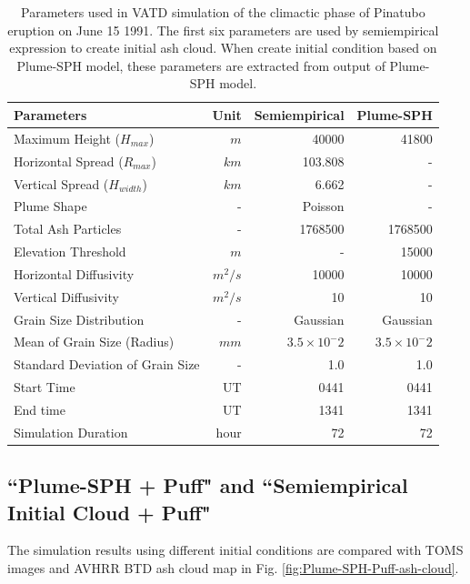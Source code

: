 \documentclass[draft,linenumbers]{agujournal2019}
\begin{document}
\begin{table}[htp]
\centering
      \caption{Parameters used in VATD simulation of the climactic phase of Pinatubo eruption on June 15 1991. The first six parameters are used by semiempirical expression to create initial ash cloud. When create initial condition based on Plume-SPH model, these parameters are extracted from output of Plume-SPH model.}
	  \begin{tabular}{lrrr}
	    \hline
	    Parameters & Unit & Semiempirical & Plume-SPH \\
	    \hline
	    Maximum Height ($H_{max}$) & $m$ & 40000 & 41800 \\
	    Horizontal Spread ($R_{max}$) & $km$ & 103.808 & -\\
	    Vertical Spread ($H_{width}$) & $km$ & 6.662  & - \\
	    Plume Shape & - & Poisson & - \\
	    Total Ash Particles  & - & 1768500 & 1768500 \\
	    Elevation Threshold & $m$ & - &  15000 \\
	    Horizontal Diffusivity & $m^2/s$ &10000 & 10000\\
	    Vertical Diffusivity & $m^2/s$ & 10 & 10 \\
	    Grain Size Distribution & - & Gaussian & Gaussian  \\
	    Mean of Grain Size (Radius) & $mm$ & $3.5 \times 10 ^-2$ & $3.5 \times 10 ^-2$ \\
	    Standard Deviation of Grain Size & - &  1.0 & 1.0 \\
	    	Start Time & UT & 0441 & 0441 \\
	    End time & UT & 1341 & 1341 \\
	    Simulation Duration & hour & 72 & 72 \\
	    \hline
	  \end{tabular}
	  \label{tab:input_parameter_Puff_simulation}
\end{table}

\subsection{``Plume-SPH + Puff" and ``Semiempirical Initial Cloud + Puff"}

The simulation results using different initial conditions are compared with TOMS images and AVHRR BTD ash cloud map in Fig. \ref{fig:Plume-SPH-Puff-ash-cloud}.
\end{document}
